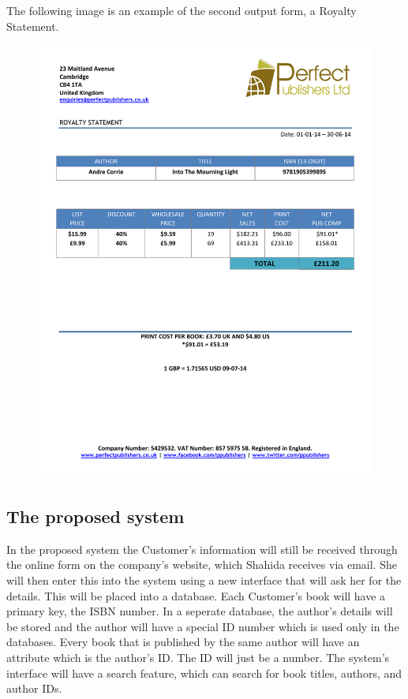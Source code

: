 The following image is an example of the second output form, a Royalty Statement.

\begin{figure}[H]
    \includegraphics[width=\textwidth]{./Analysis/Royalty Statement Example.pdf}
\end{figure}

\subsection{The proposed system}

In the proposed system the Customer's information will still be received through the online form on the company's website, which Shahida receives via email. She will then enter this into the system using a new interface that will ask her for the details. This will be placed into a database. Each Customer's book will have a primary key, the ISBN number. In a seperate database, the author's details will be stored and the author will have a special ID number which is used only in the databases. Every book that is published by the same author will have an attribute which is the author's ID. The ID will just be a number. The system's interface will have a search feature, which can search for book titles, authors, and author IDs.

